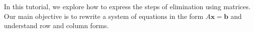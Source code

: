 \documentclass[preview]{standalone}
\begin{document}
\begin{center}
In this tutorial, we explore how to express the steps of elimination using matrices. Our main objective is to rewrite a system of equations in the form $A\mathbf{x} = \mathbf{b}$ and understand row and column forms.
\end{center}
\end{document}
